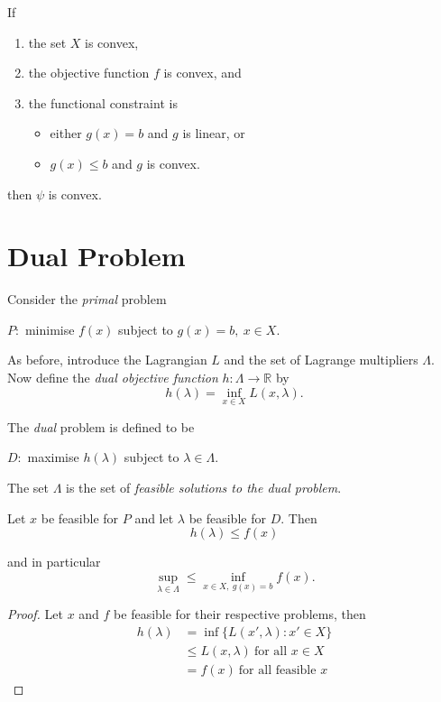 \documentclass[a4paper]{article}
\begin{document}
\begin{prop}
  If
  \begin{enumerate}
  \item the set $X$ is convex,
  \item the objective function $f$ is convex, and
  \item the functional constraint is
    \begin{itemize}
    \item either $g(x) = b$ and $g$ is linear, or
    \item $g(x) \leq b$ and $g$ is convex.
    \end{itemize}
  \end{enumerate}

  then $\psi$ is convex.
\end{prop}

\section{Dual Problem}

Consider the \emph{primal} problem

\begin{center}
  $P:$ minimise $f(x)$ subject to $g(x) = b,\: x \in X$.
\end{center}

As before, introduce the Lagrangian $L$ and the set of Lagrange multipliers $\Lambda$. Now define the \emph{dual objective function} $h: \Lambda \rightarrow \mathbb{R}$ by
\[
  h(\lambda) = \inf_{x \in X} L(x, \lambda).
\]

The \emph{dual} problem is defined to be

\begin{center}
  $D:$ maximise $h(\lambda)$ subject to $\lambda \in \Lambda$.
\end{center}

The set $\Lambda$ is the set of \emph{feasible solutions to the dual problem}.

\begin{thm}
  Let $x$ be feasible for $P$ and let $\lambda$ be feasible for $D$. Then
  \[
    h(\lambda) \leq f(x)
  \]

  and in particular
  \[
    \sup_{\lambda \in \Lambda} \leq \inf_{x \in X,\: g(x) = b} f(x).
  \]
\end{thm}

\begin{proof}
  Let $x$ and $f$ be feasible for their respective problems, then
  \begin{align*}
    h(\lambda) &= \inf\{L(x', \lambda): x' \in X \} \\
               &\leq L(x, \lambda) \: \text{for all } x \in X \\
               &= f(x) \: \text{for all feasible } x
  \end{align*}
\end{proof}
\end{document}
